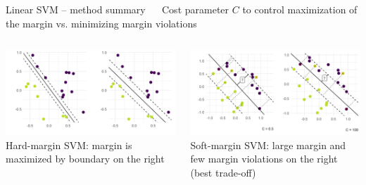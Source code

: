\begin{vbframe}{Linear SVM -- method summary}
 ~~ Cost parameter \textbf{$C$} to control maximization of the margin vs. minimizing margin violations

\hfill
\begin{columns}
    \begin{column}{0.5\textwidth}
    \centering
        \includegraphics[width=\textwidth]{
  figure/linear_classif_2.png}  \\
  \tiny{Hard-margin SVM: margin is maximized by boundary on the right}
    \end{column}
    \begin{column}{0.5\textwidth}
    \centering
  \includegraphics[width=\textwidth]{
  figure/margin_violations.png}  \\
  \tiny{Soft-margin SVM: large margin and few margin violations on the right (best trade-off)}
    \end{column}
\end{columns}

  \normalsize

\end{vbframe}




